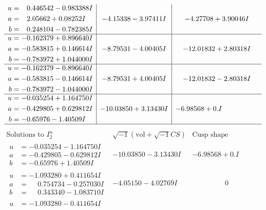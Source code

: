 \documentclass[1p]{elsarticle_modified}
\theoremstyle{definition}
\newcommand{\I}{\sqrt{-1}}
\begin{document}
$$\begin{array}{c|c|c}
\begin{aligned}
u &= \phantom{-}0.446542 - 0.983388 I \\
a &= \phantom{-}2.05662 + 0.08252 I \\
b &= \phantom{-}0.248104 - 0.782385 I\end{aligned}
 & -4.15338 - 3.97411 I & -4.27708 + 3.90046 I \\ \hline\begin{aligned}
u &= -0.162379 + 0.896640 I \\
a &= -0.583815 + 0.146614 I \\
b &= -0.783972 + 1.044000 I\end{aligned}
 & -8.79531 - 4.00405 I & -12.01832 + 2.80318 I \\ \hline\begin{aligned}
u &= -0.162379 - 0.896640 I \\
a &= -0.583815 - 0.146614 I \\
b &= -0.783972 - 1.044000 I\end{aligned}
 & -8.79531 + 4.00405 I & -12.01832 - 2.80318 I \\ \hline\begin{aligned}
u &= -0.035254 + 1.164750 I \\
a &= -0.429805 + 0.629812 I \\
b &= -0.65976 - 1.40509 I\end{aligned}
 & -10.03850 + 3.13430 I & -6.98568 + 0. I\phantom{ +0.000000I}\\
 \hline 
 \end{array}$$\newpage$$\begin{array}{c|c|c}  
\text{Solutions to }I^u_{2}& \I (\text{vol} + \sqrt{-1}CS) & \text{Cusp shape}\\
 \hline 
\begin{aligned}
u &= -0.035254 - 1.164750 I \\
a &= -0.429805 - 0.629812 I \\
b &= -0.65976 + 1.40509 I\end{aligned}
 & -10.03850 - 3.13430 I & -6.98568 + 0. I\phantom{ +0.000000I} \\ \hline\begin{aligned}
u &= -1.093280 + 0.411654 I \\
a &= \phantom{-}0.754734 - 0.257030 I \\
b &= \phantom{-}0.343340 - 1.083710 I\end{aligned}
 & -4.05150 - 4.02769 I & \phantom{-0.000000 } 0 \\ \hline\begin{aligned}
u &= -1.093280 - 0.411654 I \\

\end{aligned}
\end{array}$$
\end{document}
